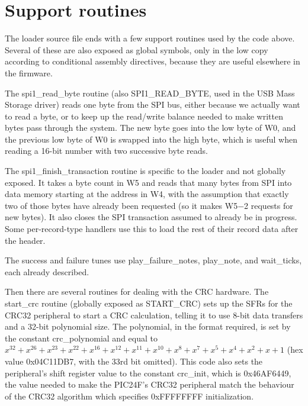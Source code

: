 \section{Support routines}

The loader source file ends with a few support routines used by the code
above.  Several of these are also exposed as global symbols, only in the low
copy according to conditional assembly directives, because they are useful
elsewhere in the firmware.

The spi1\_read\_byte routine (also SPI1\_READ\_BYTE, used in the USB Mass
Storage driver) reads one byte from the SPI bus, either because we actually
want to read a byte, or to keep up the read/write balance needed to make
written bytes pass through the system.  The new byte goes into the low byte
of W0, and the previous low byte of W0 is swapped into the high byte, which
is useful when reading a 16-bit number with two successive byte reads.

The spi1\_finish\_transaction routine is specific to the loader and not
globally exposed.  It takes a byte count in W5 and reads that many bytes
from SPI into data memory starting at the address in W4, with the assumption
that exactly two of those bytes have already been requested (so it makes
W5$-$2 requests for new bytes).  It also closes the SPI transaction assumed to
already be in progress.  Some per-record-type handlers use this to load the
rest of their record data after the header.

The success and failure tunes use play\_failure\_notes, play\_note, and
wait\_ticks, each already described.

Then there are several routines for dealing with the CRC hardware.  The
start\_crc routine (globally exposed as START\_CRC) sets up the SFRs for the
CRC32 peripheral to start a CRC calculation, telling it to use 8-bit data
transfers and a 32-bit polynomial size.  The polynomial, in the format
required, is set by the constant crc\_polynomial and equal to
$x^{32}+x^{26}+x^{23}+x^{22}+x^{16}+x^{12}+x^{11}+x^{10}+x^8+x^7+x^5+x^4+x^2+x+1$
(hex value 0x04C11DB7, with the 33rd bit omitted).  This code also sets the
peripheral's shift register value to the constant crc\_init, which is
0x46AF6449, the value needed to make the PIC24F's CRC32 peripheral match the
behaviour of the CRC32 algorithm which specifies 0xFFFFFFFF initialization.

